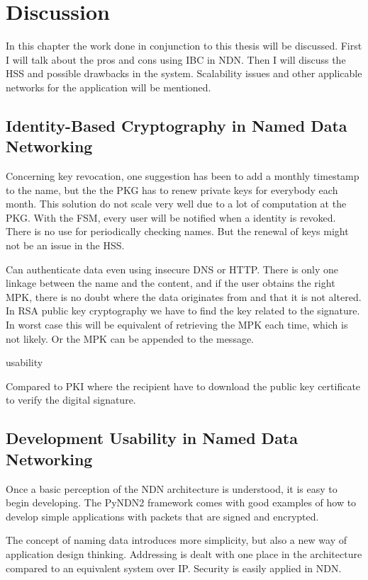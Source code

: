 \chapter{Discussion}
In this chapter the work done in conjunction to this thesis will be discussed. 
First I will talk about the pros and cons using \gls{IBC} in \gls{NDN}.
Then I will discuss the \gls{HSS} and possible drawbacks in the system. 
Scalability issues and other applicable networks for the application will be mentioned.

\section{Identity-Based Cryptography in Named Data Networking}
Concerning key revocation, one suggestion has been to add a monthly timestamp to the \gls{name}, but the the \gls{PKG} has to renew private keys for everybody each month. 
This solution do not scale very well due to a lot of computation at the \gls{PKG}.
With the \gls{FSM}, every user will be notified when a identity is revoked.
There is no use for periodically checking names.
But the renewal of keys might not be an issue in the \gls{HSS}. 

Can authenticate \gls{data} even using insecure DNS or HTTP. 
There is only one linkage between the \gls{name} and the content, and if the user obtains the right \gls{MPK}, there is no doubt where the \gls{data} originates from and that it is not altered.
In RSA public key cryptography we have to find the key related to the signature. 
In worst case this will be equivalent of retrieving the \gls{MPK} each time, which is not likely. 
Or the \gls{MPK} can be appended to the message.

usability 

Compared to \gls{PKI} where the recipient have to download the public key certificate to verify the digital signature.

\section{Development Usability in Named Data Networking}
Once a basic perception of the \gls{NDN} architecture is understood, it is easy to begin developing.
The \gls{PyNDN2} framework comes with good examples of how to develop simple applications with packets that are signed and encrypted.

The concept of naming \gls{data} introduces more simplicity, but also a new way of application design thinking.
Addressing is dealt with one place in the architecture compared to an equivalent system over \gls{IP}. 
Security is easily applied in \gls{NDN}.

